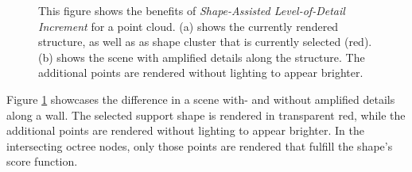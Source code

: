 \begin{figure}
\centering
{}\par\medskip
{}
\caption{This figure shows the benefits of \textit{Shape-Assisted Level-of-Detail Increment} for a point cloud. (a) shows the currently rendered structure, as well as as shape cluster that is currently selected (red). (b) shows the scene with amplified details along the structure. The additional points are rendered without lighting to appear brighter.}
\label{fig:lod_increment}
\end{figure}

Figure \ref{fig:lod_increment} showcases the difference in a scene with- and without amplified details along a wall. The selected support shape is rendered in transparent red, while the additional points are rendered without lighting to appear brighter. In the intersecting octree nodes, only those points are rendered that fulfill the shape's score function. 



